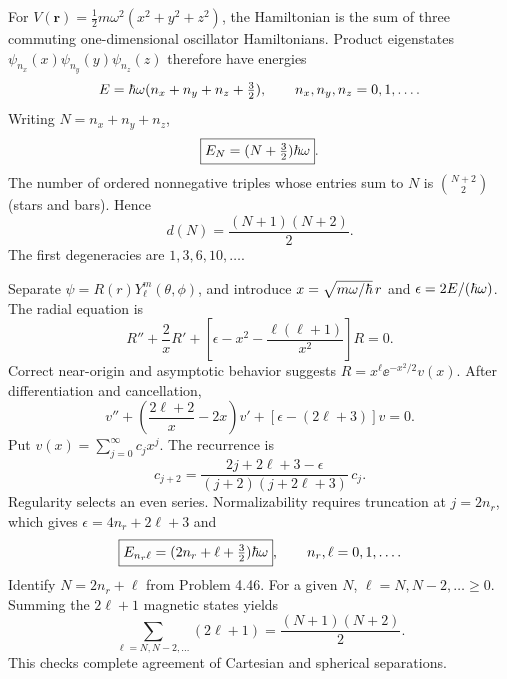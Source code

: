For $V(\mathbf r)=\frac12m\omega^2(x^2+y^2+z^2)$,
the Hamiltonian is the sum of three commuting
one-dimensional oscillator Hamiltonians.
Product eigenstates
$\psi_{n_x}(x)\psi_{n_y}(y)\psi_{n_z}(z)$
therefore have energies
\begin{equation}
E=\hbar\omega(n_x+n_y+n_z+\tfrac32),
\qquad n_x,n_y,n_z=0,1,\dots.
\end{equation}
Writing $N=n_x+n_y+n_z$,
\begin{equation}
\boxed{E_N=(N+\tfrac32)\hbar\omega}.
\end{equation}
The number of ordered nonnegative triples
whose entries sum to $N$ is
$\binom{N+2}{2}$ (stars and bars). Hence
\begin{equation}
\boxed{d(N)=\frac{(N+1)(N+2)}2}.
\end{equation}
The first degeneracies are $1,3,6,10,\dots$.

Separate $\psi=R(r)Y_\ell^m(\theta,\phi)$,
and introduce
$x=\sqrt{m\omega/\hbar}\,r$ and
$\epsilon=2E/(\hbar\omega)$.
The radial equation is
\begin{equation}
R''+\frac2xR'+
\left[\epsilon-x^2-\frac{\ell(\ell+1)}{x^2}\right]R=0.
\end{equation}
Correct near-origin and asymptotic behavior
suggests $R=x^\ell\ee^{-x^2/2}v(x)$.
After differentiation and cancellation,
\begin{equation}
v''+\left(\frac{2\ell+2}{x}-2x\right)v'
+[\epsilon-(2\ell+3)]v=0.
\end{equation}
Put $v(x)=\sum_{j=0}^\infty c_jx^j$.
The recurrence is
\begin{equation}
\boxed{c_{j+2}=
\frac{2j+2\ell+3-\epsilon}
{(j+2)(j+2\ell+3)}\,c_j}.
\end{equation}
Regularity selects an even series.
Normalizability requires truncation at
$j=2n_r$, which gives
$\epsilon=4n_r+2\ell+3$ and
\begin{equation}
\boxed{E_{n_r\ell}
=(2n_r+\ell+\tfrac32)\hbar\omega},
\qquad n_r,\ell=0,1,\dots.
\end{equation}
Identify $N=2n_r+\ell$ from Problem 4.46.
For a given $N$, $\ell=N,N-2,\dots\ge0$.
Summing the $2\ell+1$ magnetic states yields
\begin{equation}
\boxed{\sum_{\ell=N,N-2,\dots}(2\ell+1)
=\frac{(N+1)(N+2)}2}.
\end{equation}
This checks complete agreement of
Cartesian and spherical separations.

